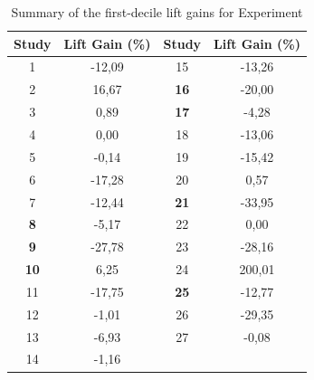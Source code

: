 \begin{table}[!ht]
\centering
\begin{adjustbox}{max width=7cm}
\begin{tabular}{|c|c|c|c|}
\hline
\textbf{Study} & \textbf{Lift Gain (\%)}        & \textbf{Study} & \textbf{Lift Gain (\%)}        \\ \hline
1              & \cellcolor[HTML]{ff514d}-12,09 & 15             & \cellcolor[HTML]{ff514d}-13,26 \\ \hline
2              & \cellcolor[HTML]{009901}16,67  & \textbf{16}    & \cellcolor[HTML]{ff514d}-20,00 \\ \hline
3              & \cellcolor[HTML]{00c901}0,89   & \textbf{17}    & \cellcolor[HTML]{ffccc9}-4,28  \\ \hline
4              & 0,00                           & 18             & \cellcolor[HTML]{ff514d}-13,06 \\ \hline
5              & \cellcolor[HTML]{ffccc9}-0,14  & 19             & \cellcolor[HTML]{ff514d}-15,42 \\ \hline
6              & \cellcolor[HTML]{ff514d}-17,28 & 20             & \cellcolor[HTML]{00c901}0,57   \\ \hline
7              & \cellcolor[HTML]{ff514d}-12,44 & \textbf{21}    & \cellcolor[HTML]{ff514d}-33,95 \\ \hline
\textbf{8}     & \cellcolor[HTML]{ffccc9}-5,17  & 22             & 0,00                           \\ \hline
\textbf{9}     & \cellcolor[HTML]{ff514d}-27,78 & 23             & \cellcolor[HTML]{ff514d}-28,16 \\ \hline
\textbf{10}    & \cellcolor[HTML]{009901}6,25   & 24             & \cellcolor[HTML]{ffce93}200,01 \\ \hline
11             & \cellcolor[HTML]{ff514d}-17,75 & \textbf{25}    & \cellcolor[HTML]{ff514d}-12,77 \\ \hline
12             & \cellcolor[HTML]{ffccc9}-1,01  & 26             & \cellcolor[HTML]{ff514d}-29,35 \\ \hline
13             & \cellcolor[HTML]{ff514d}-6,93  & 27             & \cellcolor[HTML]{ffccc9}-0,08  \\ \hline
14             & \cellcolor[HTML]{ffccc9}-1,16  &                &                                \\ \hline
\end{tabular}
\end{adjustbox}
\caption{Summary of the first-decile lift gains for Experiment \nameExperimentI}
\label{table:lift_gain_exp-i}
\end{table}

